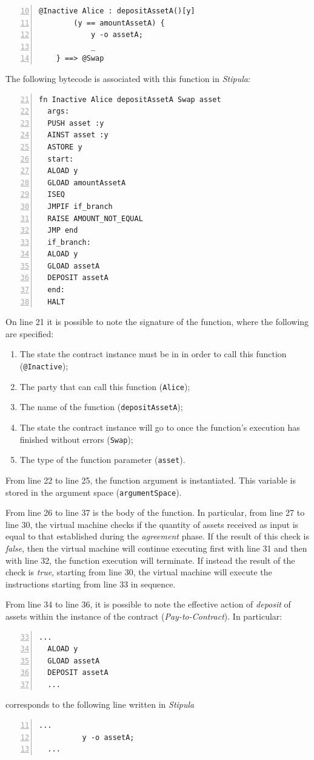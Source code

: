 \begin{Verbatim}[numbers=left,xleftmargin=1cm,firstnumber=10,tabsize=2]
  @Inactive Alice : depositAssetA()[y]
        (y == amountAssetA) {
            y -o assetA;
            _
    } ==> @Swap
\end{Verbatim}

The following bytecode is associated with this function in \textit{Stipula}:
\begin{Verbatim}[numbers=left,xleftmargin=1cm,firstnumber=21,tabsize=2]
  fn Inactive Alice depositAssetA Swap asset
  args:
  PUSH asset :y
  AINST asset :y
  ASTORE y
  start:
  ALOAD y
  GLOAD amountAssetA
  ISEQ
  JMPIF if_branch
  RAISE AMOUNT_NOT_EQUAL
  JMP end
  if_branch:
  ALOAD y
  GLOAD assetA
  DEPOSIT assetA
  end:
  HALT
\end{Verbatim}

On line 21 it is possible to note the signature of the function, where the following are specified:
\begin{enumerate}
  \item The state the contract instance must be in in order to call this function (\verb|@Inactive|);
  \item The party that can call this function (\verb|Alice|);
  \item The name of the function (\verb|depositAssetA|);
  \item The state the contract instance will go to once the function's execution has finished without 
  errors (\verb|Swap|);
  \item The type of the function parameter (\verb|asset|).
\end{enumerate}

From line 22 to line 25, the function argument is instantiated. This variable is stored in the argument 
space (\verb|argumentSpace|).

From line 26 to line 37 is the body of the function. In particular, from line 27 to line 30, the virtual 
machine checks if the quantity of assets received as input is equal to that established during the 
\textit{agreement} phase. If the result of this check is \textit{false}, then the virtual machine will 
continue executing first with line 31 and then with line 32, the function execution will terminate. If 
instead the result of the check is \textit{true}, starting from line 30, the virtual machine will execute 
the instructions starting from line 33 in sequence.

From line 34 to line 36, it is possible to note the effective action of \textit{deposit} of assets within 
the instance of the contract (\textit{Pay-to-Contract}). In particular:
\begin{Verbatim}[numbers=left,xleftmargin=1cm,firstnumber=33,tabsize=2]
  ...
  ALOAD y
  GLOAD assetA
  DEPOSIT assetA
  ...
\end{Verbatim}
corresponds to the following line written in \textit{Stipula}
\begin{Verbatim}[numbers=left,xleftmargin=1cm,firstnumber=11,tabsize=2]
  ...
          y -o assetA;
  ...
\end{Verbatim}

